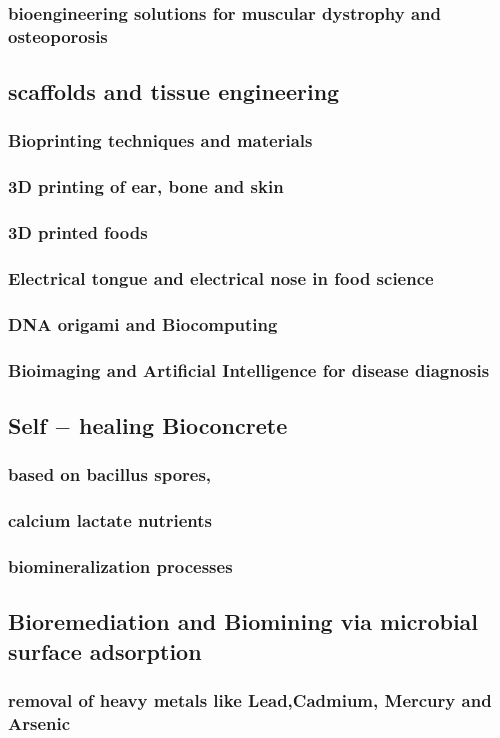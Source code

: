 \documentclass{article}
\begin{document}
	\subsubsection{bioengineering solutions for muscular dystrophy and osteoporosis}

	\subsection{scaffolds and tissue engineering}
	\subsubsection{Bioprinting techniques and materials}
	\subsubsection{3D printing of ear, bone and skin}
	\subsubsection{3D printed foods}
	\subsubsection{Electrical tongue and electrical nose in food science}
	\subsubsection{DNA origami and Biocomputing}
	\subsubsection{Bioimaging and Artificial Intelligence for disease diagnosis}

	\subsection{Self $-$ healing Bioconcrete}
	\subsubsection{based on bacillus spores,}
	\subsubsection{calcium lactate nutrients}
	\subsubsection{biomineralization processes}

	\subsection{Bioremediation and Biomining via microbial surface adsorption}
	\subsubsection{removal of heavy metals like Lead,Cadmium, Mercury and Arsenic}
	\newpage
\end{document}
